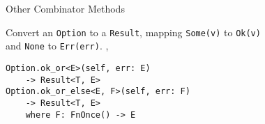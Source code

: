 
\begin{frame}[fragile]{Other Combinator Methods}

Convert an \texttt{Option} to a \texttt{Result}, mapping \texttt{Some(v)} to
\texttt{Ok(v)}\\and \texttt{None} to \texttt{Err(err)}.
\sep
\begin{verbatim}
Option.ok_or<E>(self, err: E)
    -> Result<T, E>
Option.ok_or_else<E, F>(self, err: F)
    -> Result<T, E>
    where F: FnOnce() -> E
\end{verbatim}
\end{frame}
